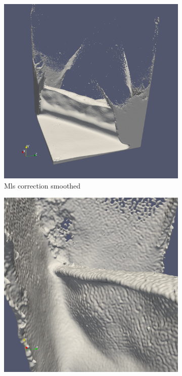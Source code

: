 \begin{figure}
\begin{center}
\begin{subfigure}[b]{0.47\textwidth}
			\includegraphics[width=\textwidth]{figures/DDMMls1.png}
			\caption{Mls correction smoothed}
		\end{subfigure}
		\begin{subfigure}[b]{0.47\textwidth}
			\includegraphics[width=\textwidth]{figures/DDMOriginal2.png}

\end{subfigure}
\end{center}
\end{figure}
